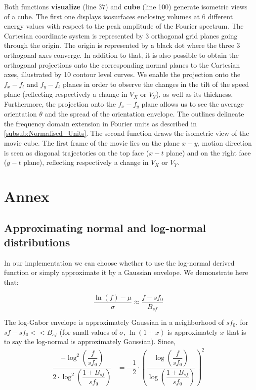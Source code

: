 \documentclass[a4paper,11pt]{article}%
\begin{document}
Both functions \textbf{visualize} (line 37) and \textbf{cube} (line 100) generate isometric views of a cube. The first one displays isosurfaces enclosing volumes at 6 different energy values with respect to the peak amplitude of the Fourier spectrum. The Cartesian coordinate system is represented by 3 orthogonal grid planes going through the origin. The origin is represented by a black dot where the three 3 orthogonal axes converge. In addition to that, it is also possible to obtain the orthogonal projections onto the corresponding normal planes to the Cartesian axes, illustrated by 10 contour level curves. We enable the projection onto the $f_x-f_t$ and $f_y-f_t$ planes in order to observe the changes in the tilt of the speed plane (reflecting respectively a change in $V_X$ or $V_Y$), as well as its thickness. Furthermore, the projection onto the $f_x-f_y$ plane allows us to see the average orientation $\theta$ and the spread of the orientation envelope. The outlines delineate the frequency domain extension in Fourier units as described in \ref{subsub:Normalised_Units}. The second function draws the isometric view of the movie cube. The first frame of the movie lies on the plane $x-y$, motion direction is seen as diagonal trajectories on the top face ($x-t$ plane) and on the right face ($y-t$ plane), reflecting respectively a change in $V_X$ or $V_Y$. %
% 
%

\appendix
\section{Annex}
\subsection{Approximating normal and log-normal distributions}
\label{appendix:Approximating distributions}

In our implementation we can choose whether to use the log-normal derived function or simply approximate it by a Gaussian envelope. We demonstrate here that:

 \[
 \dfrac{\ln(f) -\mu}{\sigma} \approx \dfrac{f -sf_{0}}{B_{sf}}
 \]
 
The log-Gabor envelope is approximately Gaussian in a neighborhood of $sf_{0}$, for $sf-sf_{0} << B_{sf}$ (for small values of $\sigma$, $\ln(1+x)$ is approximately $x$ that is to say the log-normal is approximately Gaussian).  
Since,
\begin{align}
 \dfrac{-\log^{2}\left(\dfrac{f}{sf_{0}}\right)}{2\cdot\log^{2} \left( \dfrac{1+B_{sf}}{sf_{0}} \right)} &= -\dfrac{1}{2} \cdot \left( \dfrac{\log \left (\dfrac{f}{sf_{0}}\right)}{\log\left(\dfrac{1+B_{sf}}{sf_{0}}\right)}\right)^{2}
\end{align}
 
\end{document}

